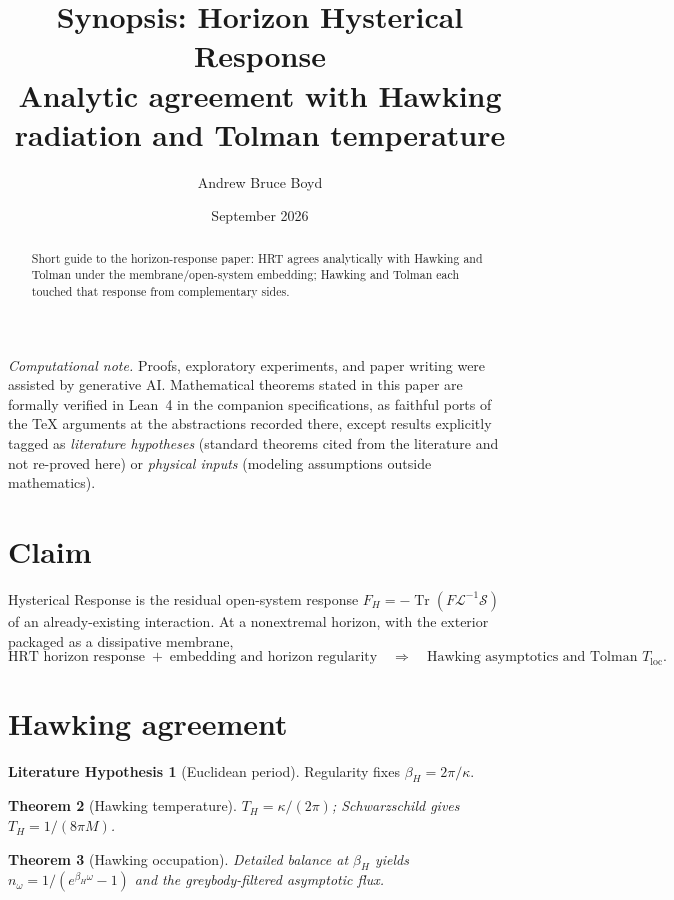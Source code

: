\documentclass[11pt]{article}
\title{\textbf{Synopsis: Horizon Hysterical Response}\\[0.35em]
\large Analytic agreement with Hawking radiation and Tolman temperature}
\author{Andrew Bruce Boyd}
\date{September 2026}
\newtheorem{theorem}{Theorem}[section]
\theoremstyle{definition}
\newtheorem{literaturehypothesis}[theorem]{Literature Hypothesis}
\theoremstyle{remark}
\newcommand{\FH}{F_H}
\newcommand{\Tr}{\operatorname{Tr}}
\begin{document}
\maketitle
\noindent\textit{Computational note.}
Proofs, exploratory experiments, and paper writing were assisted by generative AI.
Mathematical theorems stated in this paper are formally verified in Lean~4 in the
companion specifications, as faithful ports of the TeX arguments at the abstractions
recorded there, except results explicitly tagged as \emph{literature hypotheses}
(standard theorems cited from the literature and not re-proved here) or
\emph{physical inputs} (modeling assumptions outside mathematics).

\begin{abstract}
Short guide to the horizon-response paper: HRT agrees analytically with Hawking and
Tolman under the membrane/open-system embedding; Hawking and Tolman each touched that
response from complementary sides.
\end{abstract}

\section{Claim}
Hysterical Response is the residual open-system response
$\FH=-\Tr(F\mathcal L^{-1}\mathcal S)$ of an already-existing interaction.
At a nonextremal horizon, with the exterior packaged as a dissipative membrane,
\begin{equation}
\text{HRT horizon response}
\;+\;
\text{embedding and horizon regularity}
\quad\Longrightarrow\quad
\text{Hawking asymptotics and Tolman }T_{\mathrm{loc}}.
\end{equation}

\section{Hawking agreement}
\begin{literaturehypothesis}[Euclidean period]
Regularity fixes $\beta_H=2\pi/\kappa$.
\end{literaturehypothesis}

\begin{theorem}[Hawking temperature]
$T_H=\kappa/(2\pi)$; Schwarzschild gives $T_H=1/(8\pi M)$.
\end{theorem}

\begin{theorem}[Hawking occupation]
Detailed balance at $\beta_H$ yields $n_\omega=1/(e^{\beta_H\omega}-1)$ and the
greybody-filtered asymptotic flux.
\end{theorem}
\end{document}
